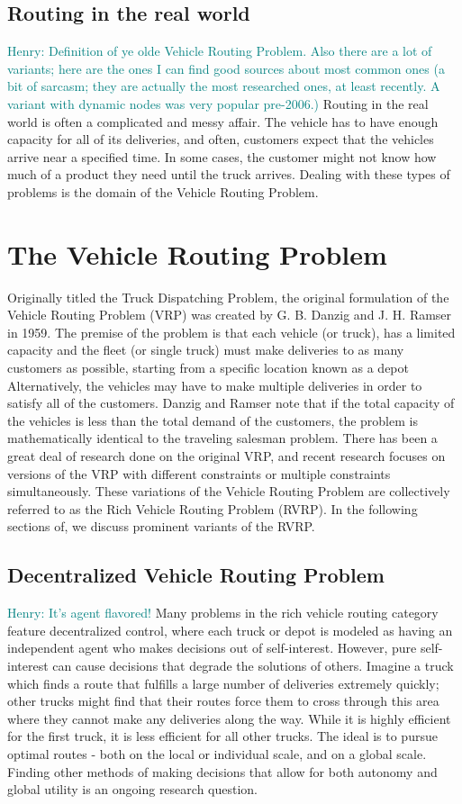 \documentclass{sig-alternate}
\newcommand{\allcomments}[1]{{#1}}
\newcommand{\hfcomment}[1]{\textcolor{Teal}{\allcomments{Henry: {#1}}}}
\begin{document}
\subsection{Routing in the real world}
\label{ssec:real}
\hfcomment{Definition of ye olde Vehicle Routing Problem. Also there are a lot of variants; here are the ones I can find good sources about most common ones (a bit of sarcasm; they are actually the most researched ones, at least recently. A variant with dynamic nodes was very popular pre-2006.)}
Routing in the real world is often a complicated and messy affair. The vehicle has to have enough capacity for all of its deliveries, and often, customers expect that the vehicles arrive near a specified time. In some cases, the customer might not know how much of a product they need until the truck arrives. Dealing with these types of problems is the domain of the Vehicle Routing Problem.
\section{The Vehicle Routing Problem}
\label{sec:VRP}
Originally titled the Truck Dispatching Problem, the original formulation of the Vehicle Routing Problem (VRP) was created by G. B. Danzig and J. H. Ramser in 1959\cite{Danzig:1959}. The premise of the problem is that each vehicle (or truck), has a limited capacity and the fleet (or single truck) must make deliveries to as many customers as possible, starting from a specific location known as a depot\cite{Caceres-Cruz:2014} Alternatively, the vehicles may have to make multiple deliveries in order to satisfy all of the customers. Danzig and Ramser note that if the total capacity of the vehicles is less than the total demand of the customers, the problem is mathematically identical to the traveling salesman problem. There has been a great deal of research done on the original VRP, and recent research focuses on versions of the VRP with different constraints or multiple constraints simultaneously. These variations of the Vehicle Routing Problem are collectively referred to as the Rich Vehicle Routing Problem (RVRP)\cite{Caceres-Cruz:2014}. In the following sections of, we discuss prominent variants of the RVRP.
\subsection{Decentralized Vehicle Routing Problem}
\hfcomment{It's agent flavored!}
Many problems in the rich vehicle routing category feature decentralized control, where each truck or depot is modeled as having an independent agent who makes decisions out of self-interest. However, pure self-interest can cause decisions that degrade the solutions of others. Imagine a truck which finds a route that fulfills a large number of deliveries extremely quickly; other trucks might find that their routes force them to cross through this area where they cannot make any deliveries along the way. While it is highly efficient for the first truck, it is less efficient for all other trucks. The ideal is to pursue optimal routes - both on the local or individual scale, and on a global scale. Finding other methods of making decisions that allow for both autonomy and global utility is an ongoing research question. 
\end{document}

